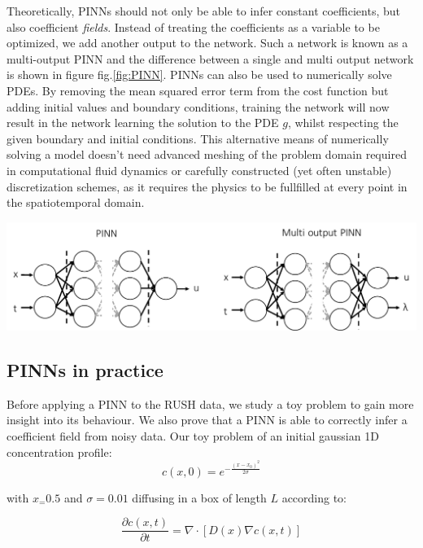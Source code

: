 \documentclass{Dissertate}
\let\origfigure\figure
\let\endorigfigure\endfigure
\renewenvironment{figure}[1][2] {
    \expandafter\origfigure\expandafter[H]
} {
    \endorigfigure
}
\begin{document}
Theoretically, PINNs should not only be able to infer constant
coefficients, but also coefficient \emph{fields}. Instead of treating
the coefficients as a variable to be optimized, we add another output to
the network. Such a network is known as a multi-output PINN and the
difference between a single and multi output network is shown in figure
fig.\ref{fig:PINN}. PINNs can also be used to numerically solve PDEs.
By removing the mean squared error term from the cost function but
adding initial values and boundary conditions, training the network will
now result in the network learning the solution to the PDE \(g\), whilst
respecting the given boundary and initial conditions. This alternative
means of numerically solving a model doesn't need advanced meshing of
the problem domain required in computational fluid dynamics or carefully
constructed (yet often unstable) discretization schemes, as it requires
the physics to be fullfilled at every point in the spatiotemporal
domain.

\begin{figure}
\hypertarget{fig:PINN}{%
\centering
\includegraphics{source/figures/pdf/PINN.pdf}
\caption{\textbf{Left panel:} a single output PINN. \textbf{Right
panel:} A multi-output PINN. The network now also predicts the
coefficients values at each data point.}\label{fig:PINN}
}
\end{figure}

\hypertarget{pinns-in-practice}{%
\subsection{PINNs in practice}\label{pinns-in-practice}}

Before applying a PINN to the RUSH data, we study a toy problem to gain
more insight into its behaviour. We also prove that a PINN is able to
correctly infer a coefficient field from noisy data. Our toy problem of
an initial gaussian 1D concentration profile: \[
c(x, 0) = e^{-\frac{(x-x_0)^2}{2\sigma}}
\]

with \(x_ = 0.5\) and \(\sigma =0.01\) diffusing in a box of length
\(L\) according to:

\begin{equation}
\frac{\partial c(x,t)}{\partial t} = \nabla \cdot[D(x)\nabla c(x,t)]
\label{eq:toyproblem}\end{equation}
\end{document}
